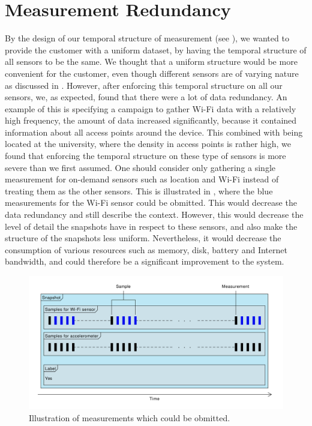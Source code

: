 
\section{Measurement Redundancy}
\label{sec:measurement_redundancy}

By the design of our temporal structure of measurement (see ), we wanted to provide the customer with a uniform dataset, by having the temporal structure of all sensors to be the same. We thought that a uniform structure would be more convenient for the customer, even though different sensors are of varying nature as discussed in . However, after enforcing this temporal structure on all our sensors, we, as expected, found that there were a lot of data redundancy. An example of this is specifying a campaign to gather Wi-Fi data with a relatively high frequency, the amount of data increased significantly, because it contained information about all access points around the device. This combined with being located at the university, where the density in access points is rather high, we found that enforcing the temporal structure on these type of sensors is more severe than we first assumed. One should consider only gathering a single measurement for on-demand sensors such as location and Wi-Fi instead of treating them as the other sensors. This is illustrated in , where the blue measurements for the Wi-Fi sensor could be obmitted. This would decrease the data redundancy and still describe the context. However, this would decrease the level of detail the snapshots have in respect to these sensors, and also make the structure of the snapshots less uniform. Nevertheless, it would decrease the consumption of various resources such as memory, disk, battery and Internet bandwidth, and could therefore be a significant improvement to the system. 

\begin{figure}[!htbp]
    \centering
    \includegraphics[width=\textwidth]{graphic/reflection/snapshot}
    \caption{Illustration of measurements which could be obmitted.}
    \label{fig:new_snapshot}
\end{figure}
\FloatBarrier